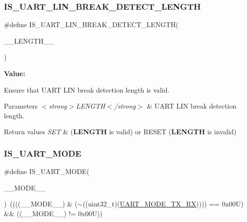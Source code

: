 \subsubsection{\texorpdfstring{IS\_UART\_LIN\_BREAK\_DETECT\_LENGTH}{IS\_UART\_LIN\_BREAK\_DETECT\_LENGTH}}
{\footnotesize\ttfamily \#define I\+S\+\_\+\+U\+A\+R\+T\+\_\+\+L\+I\+N\+\_\+\+B\+R\+E\+A\+K\+\_\+\+D\+E\+T\+E\+C\+T\+\_\+\+L\+E\+N\+G\+TH(\begin{DoxyParamCaption}\item[{}]{\+\_\+\+\_\+\+L\+E\+N\+G\+T\+H\+\_\+\+\_\+ }\end{DoxyParamCaption})}

{\bfseries Value\+:}
\begin{DoxyCode}{0}

\end{DoxyCode}


Ensure that U\+A\+RT L\+IN break detection length is valid. 


\begin{DoxyParams}{Parameters}
{\em $<$strong$>$\+L\+E\+N\+G\+T\+H$<$/strong$>$} & U\+A\+RT L\+IN break detection length. \\
\hline
\end{DoxyParams}

\begin{DoxyRetVals}{Return values}
{\em S\+ET} & ({\bfseries{L\+E\+N\+G\+TH}} is valid) or R\+E\+S\+ET ({\bfseries{L\+E\+N\+G\+TH}} is invalid) \\
\hline
\end{DoxyRetVals}
\mbox{\label{group___u_a_r_t___private___macros_gae5b637b9191dea1f8fd3846b886dd38b}} 
\subsubsection{\texorpdfstring{IS\_UART\_MODE}{IS\_UART\_MODE}}
{\footnotesize\ttfamily \#define I\+S\+\_\+\+U\+A\+R\+T\+\_\+\+M\+O\+DE(\begin{DoxyParamCaption}\item[{}]{\+\_\+\+\_\+\+M\+O\+D\+E\+\_\+\+\_\+ }\end{DoxyParamCaption})~((((\+\_\+\+\_\+\+M\+O\+D\+E\+\_\+\+\_\+) \& ($\sim$((uint32\+\_\+t)(\mbox{\hyperlink{group___u_a_r_t___mode_gab47c162935901e89322e2ce6700b6744}{U\+A\+R\+T\+\_\+\+M\+O\+D\+E\+\_\+\+T\+X\+\_\+\+RX}})))) == 0x00\+U) \&\& ((\+\_\+\+\_\+\+M\+O\+D\+E\+\_\+\+\_\+) != 0x00\+U))}




